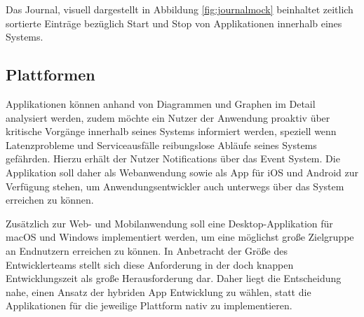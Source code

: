 \noindent
Das Journal, visuell dargestellt in Abbildung \ref{fig:journalmock} beinhaltet zeitlich sortierte Einträge
bezüglich Start und Stop von Applikationen innerhalb eines Systems.


\newpage

\subsection{Plattformen}

Applikationen können anhand von Diagrammen und Graphen im Detail analysiert werden,
zudem möchte ein Nutzer der Anwendung proaktiv über kritische Vorgänge innerhalb seines Systems informiert werden,
speziell wenn Latenzprobleme und Serviceausfälle reibungslose Abläufe seines Systems gefährden.
Hierzu erhält der Nutzer Notifications über das Event System. Die Applikation soll daher als Webanwendung sowie als App für iOS und Android
zur Verfügung stehen, um Anwendungsentwickler auch unterwegs über das System \projectname{} erreichen zu können.

Zusätzlich zur Web- und Mobilanwendung soll eine Desktop-Applikation für macOS und Windows implementiert werden,
um eine möglichst große Zielgruppe an Endnutzern erreichen zu können.
In Anbetracht der Größe des Entwicklerteams stellt sich diese Anforderung in der doch knappen Entwicklungszeit als große Herausforderung dar.
Daher liegt die Entscheidung nahe, einen Ansatz der hybriden App Entwicklung zu wählen, statt die Applikationen für die jeweilige Plattform nativ zu implementieren.
